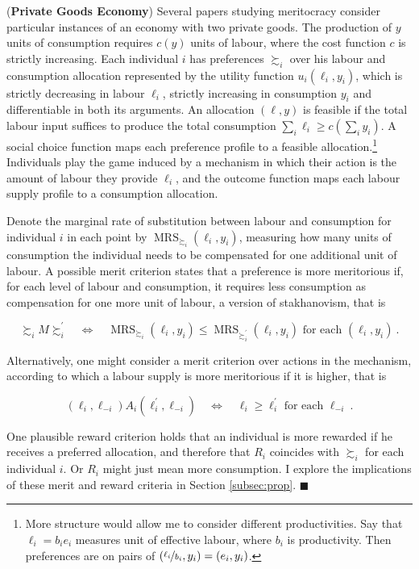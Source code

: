 \begin{example} \label{ex:priv}
	 (\textbf{Private Goods Economy}) Several papers studying meritocracy \citep{andreShallowMeritocracy2025,cappelenMeritocraticOriginEgalitarian2022,cappelenMeritPrimacyEffect2023,cappelenFairnessLimitedInformation2024,fleurbaey2008fairness} consider particular instances of an economy with two private goods. The production of \( y \) units of consumption requires \( c ( y ) \) units of labour, where the cost function \( c \) is strictly increasing. Each individual \( i \) has preferences \( \succsim_i \) over his labour and consumption allocation represented by the utility function \( u_i ( \ell_i, y_i ) \), which is strictly decreasing in labour \( \ell_i \), strictly increasing in consumption \( y_i \) and differentiable in both its arguments. An allocation  \( ( \ell, y ) \) is feasible if the total labour input suffices to produce the total consumption \( \sum_{i} \ell_i \geq c ( \sum_i y_i ) \). A social choice function maps each preference profile to a feasible allocation.\footnote{More structure would allow me to consider different productivities. Say that \( \ell_i = b_i e_i \) measures unit of effective labour, where \( b_i \) is productivity. Then preferences are on pairs of \( ( \nicefrac{\ell_i}{b_i}, y_i ) = ( e_i, y_i ) \).} Individuals play the game induced by a mechanism in which their action is the amount of labour they provide \( \ell_i \), and the outcome function maps each labour supply profile to a consumption allocation.

	Denote the marginal rate of substitution between labour and consumption for individual \( i \) in each point by \( \operatorname{MRS}_{\succsim_i} ( \ell_i, y_i ) \), measuring how many units of consumption the individual needs to be compensated for one additional unit of labour. A possible merit criterion states that a preference is more meritorious if, for each level of labour and consumption, it requires less consumption as compensation for one more unit of labour, a version of stakhanovism, that is

	\[ \succsim_i M \succsim_i^{\prime} \quad \Longleftrightarrow \quad \operatorname{MRS}_{\succsim_i} ( \ell_i, y_i ) \leq \operatorname{MRS}_{\succsim_i^{\prime}} ( \ell_i, y_i ) \text{ for each } ( \ell_i, y_i ) \: .\]

	Alternatively, one might consider a merit criterion over actions in the mechanism, according to which a labour supply is more meritorious if it is higher, that is

	\[ ( \ell_i, \ell_{-i} ) A_i ( \ell^{\prime}_i, \ell_{-i} ) \quad \Longleftrightarrow \quad  \ell_i \geq \ell^{\prime}_i \text{ for each } \ell_{-i} \: .\]

	One plausible reward criterion holds that an individual is more rewarded if he receives a preferred allocation, and therefore that \( R_i \) coincides with \( \succsim_i \) for each individual \( i \). Or \( R_i \) might just mean more consumption. I explore the implications of these merit and reward criteria in Section \ref{subsec:prop}. \hfill \( \blacksquare \)
\end{example}

